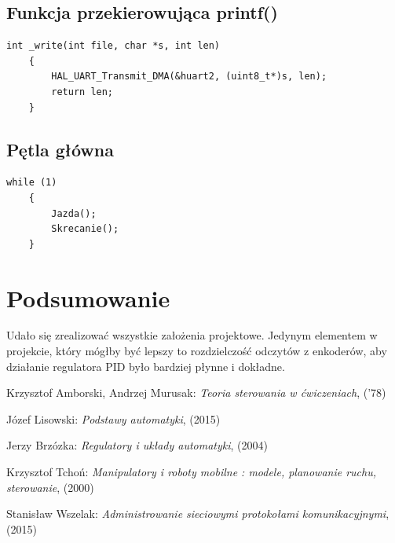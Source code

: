 \documentclass[10pt, a4paper]{article}
\begin{document}
	\subsection{Funkcja przekierowująca printf()}
	\begin{lstlisting}[tabsize=2]
	int _write(int file, char *s, int len)
	{
		HAL_UART_Transmit_DMA(&huart2, (uint8_t*)s, len);
		return len;
	}
	\end{lstlisting}
	
	\subsection{Pętla główna}
	\begin{lstlisting}[tabsize=2]
	while (1)
	{
		Jazda();
		Skrecanie();
	}
	\end{lstlisting}



\section{Podsumowanie}
Udało się zrealizować wszystkie założenia projektowe. Jedynym elementem w projekcie, który mógłby być lepszy to rozdzielczość odczytów z enkoderów, aby działanie regulatora PID było bardziej płynne \newline i dokładne.


\newpage
{}

\begin{thebibliography}{9}
	 Krzysztof Amborski, Andrzej Murusak:
	\emph{Teoria sterowania w ćwiczeniach}, ('78)
	
	 Józef Lisowski:
	\emph{Podstawy automatyki}, (2015)
	
	 Jerzy Brzózka:
	\emph{Regulatory i układy automatyki}, (2004)
	
	 Krzysztof Tchoń:
	\emph{Manipulatory i roboty mobilne : modele, planowanie ruchu, sterowanie}, (2000)
	
	 Stanisław Wszelak:
	\emph{Administrowanie sieciowymi protokołami komunikacyjnymi}, (2015)

\end{thebibliography}
\end{document}
